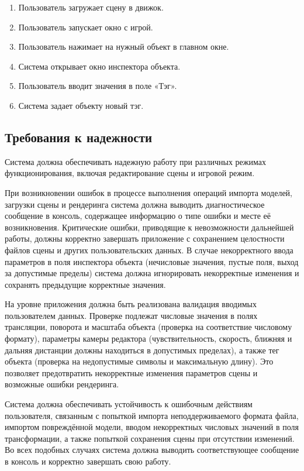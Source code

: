 \begin{enumerate}
	\item Пользователь загружает сцену в движок.
	
	\item Пользователь запускает окно с игрой.
	
	\item Пользователь нажимает на нужный объект в главном окне.
	
	\item Система открывает окно инспектора объекта.
	
	\item Пользователь вводит значения в поле «Тэг».
	
	\item Система задает объекту новый тэг.
\end{enumerate}

\subsection{Требования к надежности}
Система должна обеспечивать надежную работу при различных режимах функционирования, включая редактирование сцены и игровой режим.

При возникновении ошибок в процессе выполнения операций импорта моделей, загрузки сцены и рендеринга система должна выводить диагностическое сообщение в консоль, содержащее информацию о типе ошибки и месте её возникновения. Критические ошибки, приводящие к невозможности дальнейшей работы, должны корректно завершать приложение с сохранением целостности файлов сцены и других пользовательских данных. В случае некорректного ввода параметров в поля инспектора объекта (нечисловые значения, пустые поля, выход за допустимые пределы) система должна игнорировать некорректные изменения и сохранять предыдущие корректные значения.

На уровне приложения должна быть реализована валидация вводимых пользователем данных. Проверке подлежат числовые значения в полях трансляции, поворота и масштаба объекта (проверка на соответствие числовому формату), параметры камеры редактора (чувствительность, скорость, ближняя и дальняя дистанции должны находиться в допустимых пределах), а также тег объекта (проверка на недопустимые символы и максимальную длину). Это позволяет предотвратить некорректные изменения параметров сцены и возможные ошибки рендеринга.

Система должна обеспечивать устойчивость к ошибочным действиям пользователя, связанным с попыткой импорта неподдерживаемого формата файла, импортом повреждённой модели, вводом некорректных числовых значений в поля трансформации, а также попыткой сохранения сцены при отсутствии изменений. Во всех подобных случаях система должна выводить соответствующее сообщение в консоль и корректно завершать свою работу.

